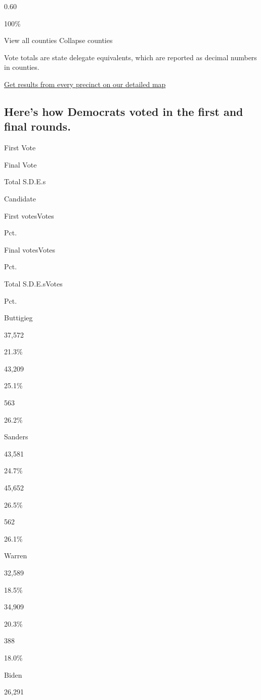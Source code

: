 0.60

100\%

View all counties Collapse counties

Vote totals are state delegate equivalents, which are reported as
decimal numbers in counties.

\href{https://www.nytimes.com/interactive/2020/02/03/us/elections/results-iowa-caucus-precinct-map.html?action=click\&module=ELEX_results\&pgtype=Interactive\&region=Component}{Get
results from every precinct on our detailed map}

\hypertarget{heres-how-democrats-voted-in-the-first-and-final-rounds}{%
\subsection{Here's how Democrats voted in the first and final
rounds.}\label{heres-how-democrats-voted-in-the-first-and-final-rounds}}

First Vote

Final Vote

Total S.D.E.s

Candidate

First votesVotes

Pct.

Final votesVotes

Pct.

Total S.D.E.sVotes

Pct.

 Buttigieg

37,572

21.3\%

43,209

25.1\%

563

26.2\%

 Sanders

43,581

24.7\%

45,652

26.5\%

562

26.1\%

 Warren

32,589

18.5\%

34,909

20.3\%

388

18.0\%

 Biden

26,291

